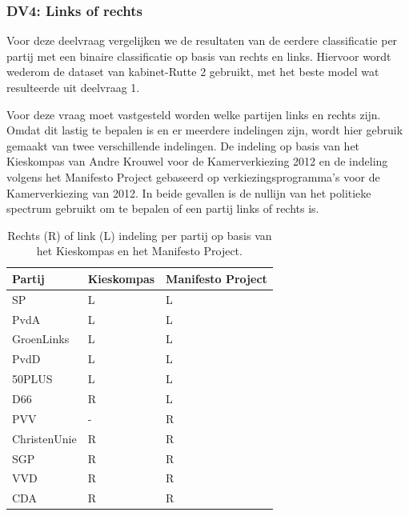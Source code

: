 \subsubsection{DV4: Links of rechts}
Voor deze deelvraag vergelijken we de resultaten van de eerdere classificatie per partij met een binaire classificatie op basis van rechts en links. Hiervoor wordt wederom de dataset van kabinet-Rutte 2 gebruikt, met het beste model wat resulteerde uit deelvraag 1. \par
Voor deze vraag moet vastgesteld worden welke partijen links en rechts zijn. Omdat dit lastig te bepalen is en er meerdere indelingen zijn, wordt hier gebruik gemaakt van twee verschillende indelingen. De indeling op basis van het Kieskompas van Andre Krouwel voor de Kamerverkiezing 2012 en de indeling volgens het Manifesto Project\cite{Volkens:2017} gebaseerd op verkiezingsprogramma's voor de Kamerverkiezing van 2012. In beide gevallen is de nullijn van het politieke spectrum gebruikt om te bepalen of een partij links of rechts is.\par

\begin{table}[H]
\centering
\caption{Rechts (R) of link (L) indeling per partij op basis van het Kieskompas en het Manifesto Project.}
\label{my-label}
\centering
\begin{tabular}{lll}
\hline
Partij  & Kieskompas & Manifesto Project \\ \hline
SP           & L & L\\ 
PvdA         & L & L\\ 
GroenLinks   & L & L\\ 
PvdD         & L & L\\ 
50PLUS       & L & L\\ 
D66          & R & L\\ 
PVV          & - & R\\ 
ChristenUnie & R & R\\ 
SGP          & R & R\\ 
VVD          & R & R\\ 
CDA          & R & R\\
\end{tabular}
\end{table}

